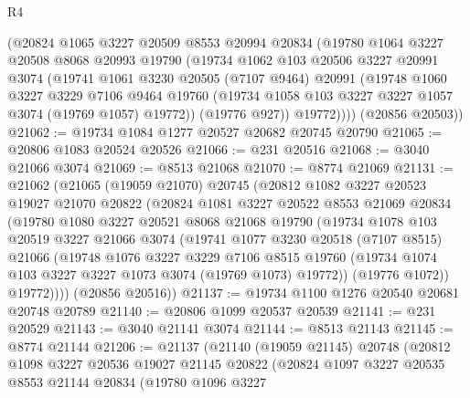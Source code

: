 \begin{lexlean}{R4}
\begin{coremodule}
        (@20824
          @1065
          @3227
          @20509
          @8553
          @20994
          @20834
          (@19780
            @1064
            @3227
            @20508
            @8068
            @20993
            @19790
            (@19734
              @1062
              @103
              @20506
              @3227
              @20991
              @3074
              (@19741
                @1061
                @3230
                @20505
                (@7107 @9464)
                @20991
                (@19748
                  @1060
                  @3227
                  @3229
                  @7106
                  @9464
                  @19760
                  (@19734 @1058 @103 @3227 @3227 @1057 @3074 (@19769 @1057) @19772))
                (@19776 @927))
              @19772))))
      (@20856 @20503))
@21062 := @19734 @1084 @1277 @20527 @20682 @20745 @20790
@21065 := @20806 @1083 @20524 @20526
@21066 := @231 @20516
@21068 := @3040 @21066 @3074
@21069 := @8513 @21068
@21070 := @8774 @21069
@21131 := @21062
    (@21065
      (@19059 @21070)
      @20745
      (@20812
        @1082
        @3227
        @20523
        @19027
        @21070
        @20822
        (@20824
          @1081
          @3227
          @20522
          @8553
          @21069
          @20834
          (@19780
            @1080
            @3227
            @20521
            @8068
            @21068
            @19790
            (@19734
              @1078
              @103
              @20519
              @3227
              @21066
              @3074
              (@19741
                @1077
                @3230
                @20518
                (@7107 @8515)
                @21066
                (@19748
                  @1076
                  @3227
                  @3229
                  @7106
                  @8515
                  @19760
                  (@19734 @1074 @103 @3227 @3227 @1073 @3074 (@19769 @1073) @19772))
                (@19776 @1072))
              @19772))))
      (@20856 @20516))
@21137 := @19734 @1100 @1276 @20540 @20681 @20748 @20789
@21140 := @20806 @1099 @20537 @20539
@21141 := @231 @20529
@21143 := @3040 @21141 @3074
@21144 := @8513 @21143
@21145 := @8774 @21144
@21206 := @21137
    (@21140
      (@19059 @21145)
      @20748
      (@20812
        @1098
        @3227
        @20536
        @19027
        @21145
        @20822
        (@20824
          @1097
          @3227
          @20535
          @8553
          @21144
          @20834
          (@19780
            @1096
            @3227

\end{coremodule}
\end{lexlean}
